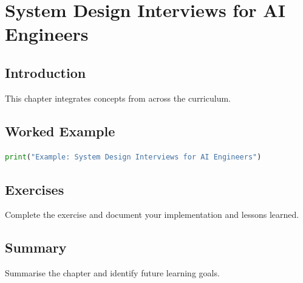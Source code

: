 \chapter{System Design Interviews for AI Engineers}
\label{chap:vol11-7}



\section{Introduction}
This chapter integrates concepts from across the curriculum.

\section{Worked Example}
\begin{lstlisting}[language=Python]
print("Example: System Design Interviews for AI Engineers")
\end{lstlisting}

\section{Exercises}
\begin{exercise}
Complete the exercise and document your implementation and lessons learned.
\end{exercise}

\section{Summary}
Summarise the chapter and identify future learning goals.
